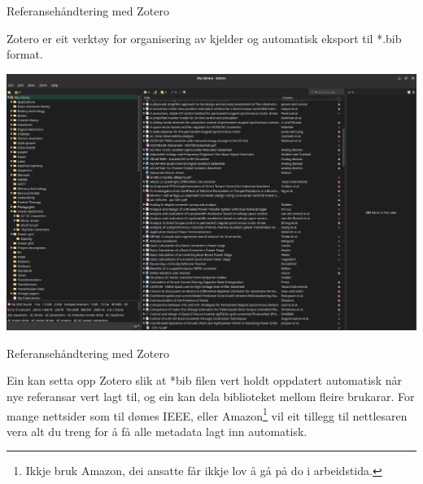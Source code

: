 \begin{frame}{Referansehåndtering med Zotero}

  Zotero er eit verktøy for organisering av kjelder og automatisk eksport til *.bib format.

  \includegraphics[width=\textwidth]{img/zotero_screenshot.png}
	
\end{frame}

\begin{frame}{Referansehåndtering med Zotero}

  Ein kan setta opp Zotero slik at *bib filen vert holdt oppdatert automatisk når nye referansar vert lagt til, og ein kan dela biblioteket mellom fleire brukarar. For mange nettsider som til dømes IEEE, eller Amazon\footnote{Ikkje bruk Amazon, dei ansatte får ikkje lov å gå på do i arbeidstida.} vil eit tillegg til nettlesaren vera alt du treng for å få alle metadata lagt inn automatisk.
  
\end{frame}

